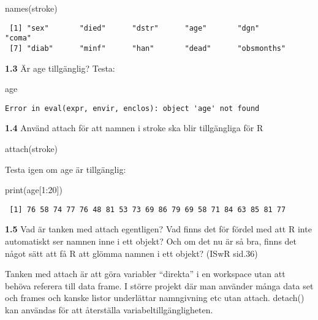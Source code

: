 \documentclass[
  letterpaper,
  DIV=11,
  numbers=noendperiod]{scrartcl}
\newenvironment{Shaded}{\begin{snugshade}}{\end{snugshade}}
\newcommand{\DecValTok}[1]{\textcolor[rgb]{0.68,0.00,0.00}{#1}}
\newcommand{\FunctionTok}[1]{\textcolor[rgb]{0.28,0.35,0.67}{#1}}
\newcommand{\NormalTok}[1]{\textcolor[rgb]{0.00,0.23,0.31}{#1}}
\newcommand{\SpecialCharTok}[1]{\textcolor[rgb]{0.37,0.37,0.37}{#1}}
\begin{document}
\begin{Shaded}
\begin{Highlighting}[]
\FunctionTok{names}\NormalTok{(stroke)}
\end{Highlighting}
\end{Shaded}

\begin{verbatim}
 [1] "sex"       "died"      "dstr"      "age"       "dgn"       "coma"     
 [7] "diab"      "minf"      "han"       "dead"      "obsmonths"
\end{verbatim}

\textbf{1.3} Är age tillgänglig? Testa:

\begin{Shaded}
\begin{Highlighting}[]
\NormalTok{age}
\end{Highlighting}
\end{Shaded}

\begin{verbatim}
Error in eval(expr, envir, enclos): object 'age' not found
\end{verbatim}

\textbf{1.4} Använd attach för att namnen i stroke ska blir tillgängliga
för R

\begin{Shaded}
\begin{Highlighting}[]
\FunctionTok{attach}\NormalTok{(stroke)}
\end{Highlighting}
\end{Shaded}

Testa igen om age är tillgänglig:

\begin{Shaded}
\begin{Highlighting}[]
\FunctionTok{print}\NormalTok{(age[}\DecValTok{1}\SpecialCharTok{:}\DecValTok{20}\NormalTok{])}
\end{Highlighting}
\end{Shaded}

\begin{verbatim}
 [1] 76 58 74 77 76 48 81 53 73 69 86 79 69 58 71 84 63 85 81 77
\end{verbatim}

\textbf{1.5} Vad är tanken med attach egentligen? Vad finns det för
fördel med att R inte automatiskt ser namnen inne i ett objekt? Och om
det nu är så bra, finns det något sätt att få R att glömma namnen i ett
objekt? (ISwR sid.36)

Tanken med attach är att göra variabler ``direkta'' i en workspace utan
att behöva referera till data frame. I större projekt där man använder
många data set och frames och kanske listor underlättar namngivning etc
utan attach. detach() kan användas för att återställa
variabeltillgängligheten.
\end{document}
